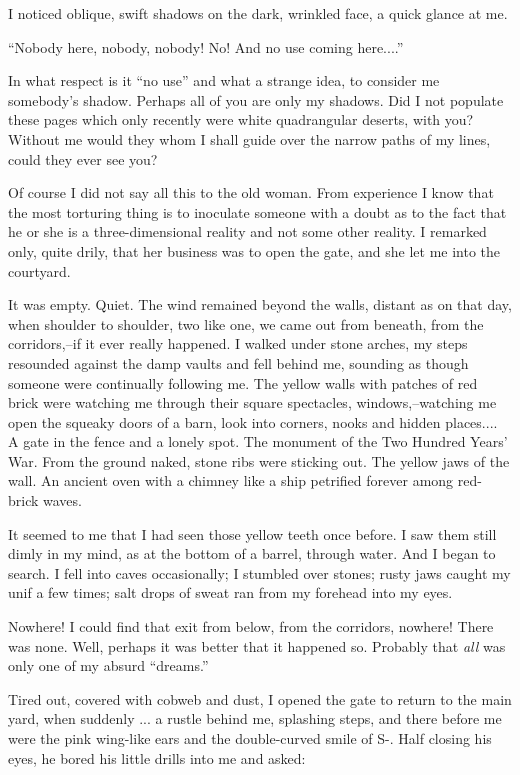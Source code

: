 \documentclass[11pt,openany]{book}
\begin{document}
I noticed oblique, swift shadows on the dark, wrinkled face, a quick glance at me.

``Nobody here, nobody, nobody! No! And no use coming here....''

In what respect is it ``no use'' and what a strange idea, to consider me somebody's shadow. Perhaps all of you are only my shadows. Did I not populate these pages which only recently were white quadrangular deserts, with you? Without me would they whom I shall guide over the narrow paths of my lines, could they ever see you?

Of course I did not say all this to the old woman. From experience I know that the most torturing thing is to inoculate someone with a doubt as to the fact that he or she is a three-dimensional reality and not some other reality. I remarked only, quite drily, that her business was to open the gate, and she let me into the courtyard.

It was empty. Quiet. The wind remained beyond the walls, distant as on that day, when shoulder to shoulder, two like one, we came out from beneath, from the corridors,--if it ever really happened. I walked under stone arches, my steps resounded against the damp vaults and fell behind me, sounding as though someone were continually following me. The yellow walls with patches of red brick were watching me through their square spectacles, windows,--watching me open the squeaky doors of a barn, look into corners, nooks and hidden places.... A gate in the fence and a lonely spot. The monument of the Two Hundred Years' War. From the ground naked, stone ribs were sticking out. The yellow jaws of the wall. An ancient oven with a chimney like a ship petrified forever among red-brick waves.

It seemed to me that I had seen those yellow teeth once before. I saw them still dimly in my mind, as at the bottom of a barrel, through water. And I began to search. I fell into caves occasionally; I stumbled over stones; rusty jaws caught my unif a few times; salt drops of sweat ran from my forehead into my eyes.

Nowhere! I could find that exit from below, from the corridors, nowhere! There was none. Well, perhaps it was better that it happened so. Probably that \emph{all} was only one of my absurd ``dreams.''

Tired out, covered with cobweb and dust, I opened the gate to return to the main yard, when suddenly ... a rustle behind me, splashing steps, and there before me were the pink wing-like ears and the double-curved smile of S-. Half closing his eyes, he bored his little drills into me and asked:
\end{document}
